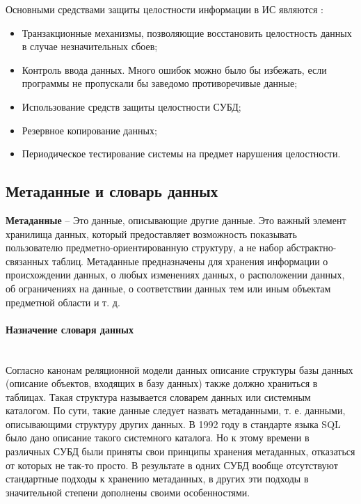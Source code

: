 Основными средствами защиты целостности информации в ИС являются \autocite{Pirogov2009}:
\begin{itemize}
    \item Транзакционные механизмы, позволяющие восстановить целостность данных в случае незначительных сбоев;
    \item Контроль ввода данных. Много ошибок можно было бы избежать, если программы не пропускали бы заведомо противоречивые данные;
    \item Использование средств защиты целостности СУБД;
    \item Резервное копирование данных;
    \item Периодическое тестирование системы на предмет нарушения целостности.
\end{itemize}

\subsection{Метаданные и словарь данных}

\begin{grayquote}
	\textbf{Метаданные} -- Это данные, описывающие другие данные. Это важный
элемент хранилища данных, который предоставляет возможность показывать пользователю предметно-ориентированную структуру, а не набор абстрактно-связанных таблиц. Метаданные предназначены для хранения
информации о происхождении данных, о любых изменениях данных, о
расположении данных, об ограничениях на данные, о соответствии данных тем или иным объектам предметной области и т. д. \autocite{Pirogov2009}
\end{grayquote}

\paragraph{Назначение словаря данных} ~\\

Согласно канонам реляционной модели данных описание структуры базы
данных (описание объектов, входящих в базу данных) также должно храниться в таблицах. Такая структура называется словарем данных или системным каталогом. По сути, такие данные следует назвать метаданными, т. е. данными, описывающими структуру других
данных.
В 1992 году в стандарте языка SQL было дано описание такого системного
каталога. Но к этому времени в различных СУБД были приняты свои принципы хранения метаданных, отказаться от которых не так-то просто. В результате в одних СУБД вообще отсутствуют стандартные подходы к хранению метаданных, в других эти подходы в значительной степени дополнены своими особенностями. \autocite{Pirogov2009}

